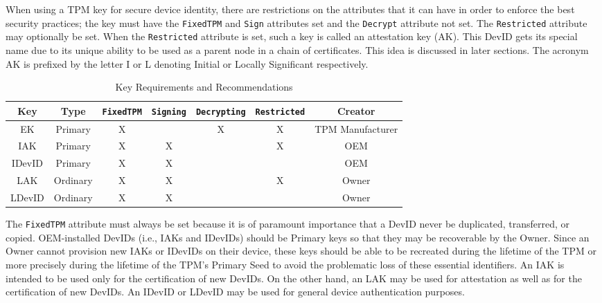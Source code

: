 When using a TPM key for secure device identity, there are restrictions on the attributes that it can have in order to enforce the best security practices; the key must have the \verb|FixedTPM| and \verb|Sign| attributes set and the \verb|Decrypt| attribute not set. The \verb|Restricted| attribute may optionally be set. When the \verb|Restricted| attribute is set, such a key is called an attestation key (AK). This DevID gets its special name due to its unique ability to be used as a parent node in a chain of certificates. This idea is discussed in later sections. The acronym AK is prefixed by the letter I or L denoting Initial or Locally Significant respectively. 
\begin{table}[h]
  \begin{center}
    \scriptsize 
    \sffamily
    \renewcommand{\arraystretch}{1.5}
    \begin{tabular}{ |c|c|c|c|c|c|c| }
      \hline
      Key & Type & \verb|FixedTPM| & \verb|Signing| & \verb|Decrypting| & \verb|Restricted| & Creator \\
      \hline
      \hline
      EK & Primary       & X &   & X & X & TPM Manufacturer \\
      \hline
      IAK & Primary      & X & X &   & X & OEM \\
      \hline
      IDevID & Primary   & X & X &   &   & OEM \\
      \hline
      LAK & Ordinary     & X & X &   & X & Owner \\
      \hline
      LDevID & Ordinary  & X & X &   &   & Owner \\
      \hline
    \end{tabular}
    \caption{Key Requirements and Recommendations}
    \label{fig:req_and_recs}
  \end{center}
\end{table}
The \verb|FixedTPM| attribute must always be set because it is of paramount importance that a DevID never be duplicated, transferred, or copied. OEM-installed DevIDs (i.e., IAKs and IDevIDs) should be Primary keys so that they may be recoverable by the Owner. Since an Owner cannot provision new IAKs or IDevIDs on their device, these keys should be able to be recreated during the lifetime of the TPM or more precisely during the lifetime of the TPM’s Primary Seed to avoid the problematic loss of these essential identifiers. An IAK is intended to be used only for the certification of new DevIDs. On the other hand, an LAK may be used for attestation as well as for the certification of new DevIDs. An IDevID or LDevID may be used for general device authentication purposes. 


